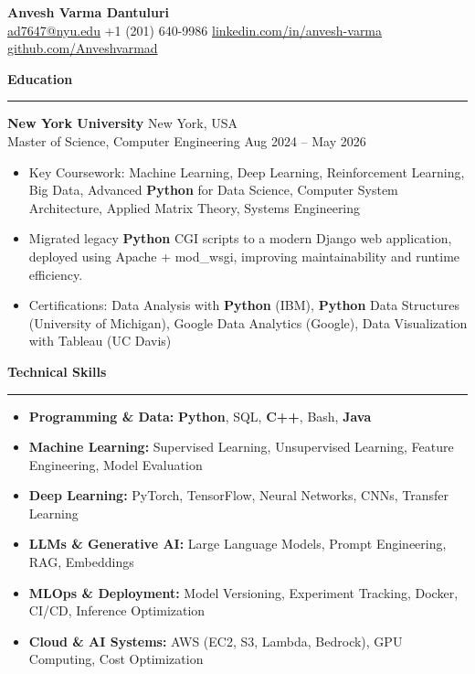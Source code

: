 \documentclass{article} %
\newcommand{\sectionheader}[1]{\vspace{0.1in}\noindent\color{black}\Large\textbf{#1}\par\rule{\linewidth}{0.8pt}\vspace{-0.1in}} %
\begin{document}
\RaggedRight %

\begin{center}
    {\Huge\textbf{Anvesh Varma Dantuluri}}\\[5pt]
    \normalsize
    \faEnvelope \hspace{2pt} \href{mailto:ad7647@nyu.edu}{\color{black}ad7647@nyu.edu} \hspace{10pt}
    \faPhone \hspace{2pt} +1 (201) 640-9986 \hspace{10pt}
    \faLinkedin \hspace{2pt} \href{https://linkedin.com/in/anvesh-varma}{\color{black}linkedin.com/in/anvesh-varma} \hspace{10pt}
    \faGithub \hspace{2pt} \href{https://github.com/Anveshvarmad}{\color{black}github.com/Anveshvarmad}
\end{center}

\sectionheader{Education}
\vspace{-5pt}
\noindent\textbf{New York University} \hfill New York, USA \\
Master of Science, Computer Engineering \hfill Aug 2024 – May 2026
\begin{itemize}
    \item Key Coursework: Machine Learning, Deep Learning, Reinforcement Learning, Big Data, Advanced \textbf{Python} for Data Science, Computer System Architecture, Applied Matrix Theory, Systems Engineering
    \item Migrated legacy \textbf{Python} CGI scripts to a modern Django web application, deployed using Apache + mod\_wsgi, improving maintainability and runtime efficiency.
    \item Certifications: Data Analysis with \textbf{Python} (IBM), \textbf{Python} Data Structures (University of Michigan), Google Data Analytics (Google), Data Visualization with Tableau (UC Davis)
\end{itemize}

\sectionheader{Technical Skills}
\vspace{-5pt}
\begin{itemize}
    \item \textbf{Programming \& Data:} \textbf{Python}, SQL, \textbf{C++}, Bash, \textbf{Java}
    \item \textbf{Machine Learning:} Supervised Learning, Unsupervised Learning, Feature Engineering, Model Evaluation
    \item \textbf{Deep Learning:} PyTorch, TensorFlow, Neural Networks, CNNs, Transfer Learning
    \item \textbf{LLMs \& Generative AI:} Large Language Models, Prompt Engineering, RAG, Embeddings
    \item \textbf{MLOps \& Deployment:} Model Versioning, Experiment Tracking, Docker, CI/CD, Inference Optimization
    \item \textbf{Cloud \& AI Systems:} AWS (EC2, S3, Lambda, Bedrock), GPU Computing, Cost Optimization
\end{itemize}
\end{document}
